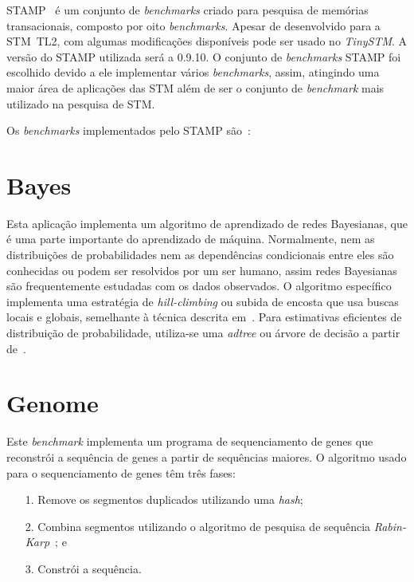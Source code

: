 \documentclass[diss,capa]{texufpel}
\begin{document}
STAMP~\cite{STAMP} é um conjunto de \emph{benchmarks} criado para pesquisa de memórias transacionais, composto por oito \emph{benchmarks}. Apesar de desenvolvido para a STM~TL2, com algumas modificações disponíveis pode ser usado no \emph{TinySTM}.  A versão do STAMP utilizada será a 0.9.10. O conjunto de \emph{benchmarks} STAMP foi escolhido devido a ele implementar vários \emph{benchmarks}, assim, atingindo uma maior área de aplicações das STM além de ser o conjunto de \emph{benchmark} mais utilizado na pesquisa de STM.


Os \emph{benchmarks} implementados pelo STAMP são~\cite{STAMP}:
\newline


\section{\textbf{Bayes}}

Esta aplicação implementa um algoritmo de aprendizado de redes Bayesianas, que é uma parte importante do aprendizado de máquina. Normalmente, nem as distribuições de probabilidades nem as dependências condicionais entre eles são conhecidas ou podem ser resolvidos por um ser humano, assim redes Bayesianas são frequentemente estudadas com os dados observados. O algoritmo específico implementa uma estratégia de \emph{hill-climbing} ou subida de encosta que usa buscas locais e globais, semelhante à técnica descrita em~\cite{bayesian}. Para estimativas eficientes de distribuição de probabilidade, utiliza-se uma \emph{adtree} ou árvore de decisão a partir de~\cite{Moore97}.


\section{\textbf{Genome}}

Este \emph{benchmark} implementa um programa de sequenciamento de genes que reconstrói a sequência de genes a partir de sequências maiores. O algoritmo usado para o sequenciamento de genes têm  três fases:

\begin{enumerate}
  \item [1.] Remove os segmentos duplicados utilizando uma \emph{hash};
  \item [2.] Combina segmentos utilizando o algoritmo de pesquisa de sequência \emph{Rabin-Karp}~\cite{Karp87}; e
  \item [3.] Constrói a sequência.
  \newline
\end{enumerate}
\end{document}
